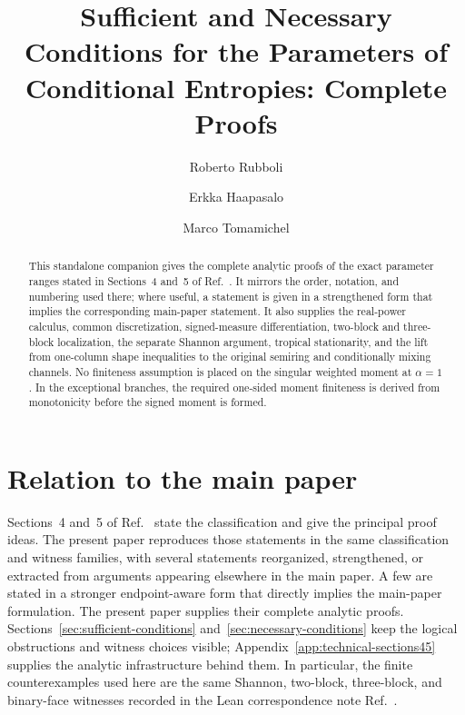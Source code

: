\documentclass[aps,pra,11pt,onecolumn,nofootinbib,tightenlines]{revtex4-2}
\theoremstyle{definition}
\begin{document}
\title{Sufficient and Necessary Conditions for the Parameters of Conditional Entropies: Complete Proofs}

\begin{abstract}
This standalone companion gives the complete analytic proofs of the exact
parameter ranges stated in Sections~4 and~5 of
Ref.~\cite{rubboli2026complete}. It mirrors the order, notation, and numbering
used there; where useful, a statement is given in a strengthened form that
implies the corresponding main-paper statement. It also supplies the real-power
calculus, common discretization, signed-measure differentiation, two-block and
three-block localization, the separate Shannon argument, tropical stationarity,
and the lift from one-column shape inequalities to the original semiring and
conditionally mixing channels. No finiteness assumption is placed on the
singular weighted moment at $\alpha=1$. In the exceptional branches, the required one-sided moment
finiteness is derived from monotonicity before the signed moment is formed.
\end{abstract}

\author{Roberto Rubboli}
\noaffiliation
\author{Erkka Haapasalo}
\noaffiliation
\author{Marco Tomamichel}
\noaffiliation

\maketitle
\tableofcontents

\section*{Relation to the main paper}

Sections~4 and~5 of Ref.~\cite{rubboli2026complete} state the classification
and give the principal proof ideas.  The present paper reproduces those
statements in the same classification and witness families, with several statements reorganized, strengthened, or extracted from arguments appearing elsewhere in the main paper. A few are stated in a
stronger endpoint-aware form that directly implies the main-paper formulation.  The
present paper supplies their complete analytic proofs.
Sections~\ref{sec:sufficient-conditions}
and~\ref{sec:necessary-conditions} keep the logical obstructions and witness
choices visible; Appendix~\ref{app:technical-sections45} supplies the analytic
infrastructure behind them.  In particular, the finite counterexamples used
here are the same Shannon, two-block, three-block, and binary-face witnesses
recorded in the Lean correspondence note
Ref.~\cite{rubboli2026parametersLean}.
\end{document}
